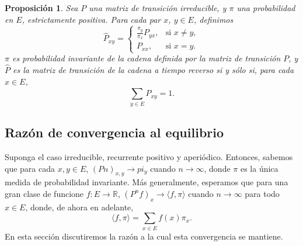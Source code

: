 \documentclass[a4paper]{article}
\newtheorem{prop}{Proposici\'on}
\numberwithin{equation}{subsection}
\def\R{\mathbb R}
\begin{document}
\begin{prop}
Sea $P$ una matriz de transición irreducible, y $\pi$ una probabilidad en $E$, estrictamente positiva. Para cada par $x$, $y\in E$, definimos
\[\hat{P}_{xy}= \begin{cases}
                \frac{\pi_y}{\pi_x}P_{yx}, & \text{si }x\neq y,\\
                P_{xx}, & \text{si }x=y.
                \end{cases}\]
$\pi$ es probabilidad invariante de la cadena definida por la matriz de transición $P$, y $\hat{P}$ es la matriz de transición de la cadena a tiempo reverso si y sólo si, para cada $x\in E$,
\[\sum_{y\in E} \hat{P}_{xy} = 1.\]
\end{prop}

\subsection{Razón de convergencia al equilibrio}
Suponga el caso irreducible, recurrente positivo y aperiódico. Entonces, sabemos que para cada $x,y \in E$, $(Pn)_{x,y}\rightarrow pi_y$ cuando $n\rightarrow \infty$, donde $\pi$ es la única medida de probabilidad invariante. Más generalmente, esperamos que para una gran clase de funcione $f:E\rightarrow \R$, $(P^nf)_{x}\rightarrow \langle f,\pi \rangle$ cuando $n\rightarrow \infty$ para todo $x\in E$, donde, de ahora en adelante,
\[\langle f,\pi \rangle = \sum_{x\in E}f(x)\pi_x.\]
En esta sección discutiremos la razón a la cual esta convergencia se mantiene.
\end{document}
